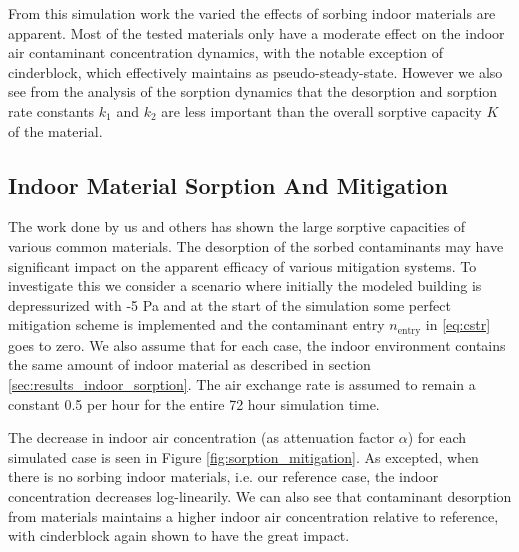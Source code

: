 From this simulation work the varied the effects of sorbing indoor materials are apparent.
Most of the tested materials only have a moderate effect on the indoor air contaminant concentration dynamics, with the notable exception of cinderblock, which effectively maintains as pseudo-steady-state.
However we also see from the analysis of the sorption dynamics that the desorption and sorption rate constants $k_1$ and $k_2$ are less important than the overall sorptive capacity $K$ of the material.\par

\subsection{Indoor Material Sorption And Mitigation}\label{sec:results_indoor_mitigation}

The work done by us and others has shown the large sorptive capacities of various common materials.
The desorption of the sorbed contaminants may have significant impact on the apparent efficacy of various mitigation systems.
To investigate this we consider a scenario where initially the modeled building is depressurized with -5 Pa and at the start of the simulation some perfect mitigation scheme is implemented and the contaminant entry $n_\mathrm{entry}$ in \eqref{eq:cstr} goes to zero.
We also assume that for each case, the indoor environment contains the same amount of indoor material as described in section \ref{sec:results_indoor_sorption}.
The air exchange rate is assumed to remain a constant 0.5 per hour for the entire 72 hour simulation time.\par %

The decrease in indoor air concentration (as attenuation factor $\alpha$) for each simulated case is seen in Figure \ref{fig:sorption_mitigation}.
As excepted, when there is no sorbing indoor materials, i.e. our reference case, the indoor concentration decreases log-linearily.
We can also see that contaminant desorption from materials maintains a higher indoor air concentration relative to reference, with cinderblock again shown to have the great impact.\par

